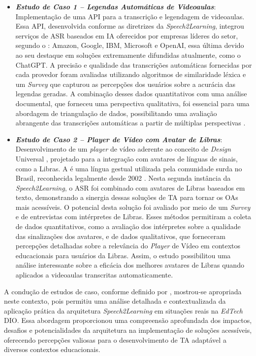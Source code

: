 \begin{itemize}
\item \textbf{\textit{Estudo de Caso 1 -- Legendas Automáticas de Videoaulas}}: Implementação de uma API para a transcrição e legendagem de videoaulas. Essa API, desenvolvida conforme as diretrizes da \textit{Speech2Learning}, integrou serviços de ASR baseados em IA oferecidos por empresas líderes do setor, segundo o : Amazon, Google, IBM, Microsoft e OpenAI, essa última devido ao seu destaque em soluções extremamente difundidas atualmente, como o ChatGPT. A precisão e qualidade das transcrições automáticas fornecidas por cada provedor foram avaliadas utilizando algoritmos de similaridade léxica e um \textit{Survey} que capturou as percepções dos usuários sobre a acurácia das legendas geradas. A combinação desses dados quantitativos com uma análise documental, que forneceu uma perspectiva qualitativa, foi essencial para uma abordagem de triangulação de dados, possibilitando uma avaliação abrangente das transcrições automáticas a partir de múltiplas perspectivas \cite{FalvoJr2023_HICSS, FalvoJr2024_FIE}.

\item \textbf{\textit{Estudo de Caso 2 -- Player de Vídeo com Avatar de Libras}}: Desenvolvimento de um \textit{player} de vídeo aderente ao conceito de \textit{Design} Universal \cite{GovBr2023}, projetado para a integração com avatares de línguas de sinais, como a Libras. A  é uma língua gestual utilizada pela comunidade surda no Brasil, reconhecida legalmente desde 2002 \cite{Quadros2017, Quadros2019, Honora2021}. Nesta segunda instância da \textit{Speech2Learning}, o ASR foi combinado com avatares de Libras baseados em texto, demonstrando a sinergia dessas soluções de TA para tornar os OAs mais acessíveis. O potencial desta solução foi avaliado por meio de um \textit{Survey} e de entrevistas com intérpretes de Libras. Esses métodos permitiram a coleta de dados quantitativos, como a avaliação dos intérpretes sobre a qualidade das sinalizações dos avatares, e de dados qualitativos, que forneceram percepções detalhadas sobre a relevância do \textit{Player} de Vídeo em contextos educacionais para usuários da Libras. Assim, o estudo possibilitou uma análise interessante sobre a eficácia dos melhores avatares de Libras quando aplicados a videoaulas transcritas automaticamente.
\end{itemize}

A condução de estudos de caso, conforme definido por , mostrou-se apropriada neste contexto, pois permitiu uma análise detalhada e contextualizada da aplicação prática da arquitetura \textit{Speech2Learning} em situações reais na \textit{EdTech} DIO. Essa abordagem proporcionou uma compreensão aprofundada dos impactos, desafios e potencialidades da arquitetura na implementação de soluções acessíveis, oferecendo percepções valiosas para o desenvolvimento de TA adaptável a diversos contextos educacionais.

